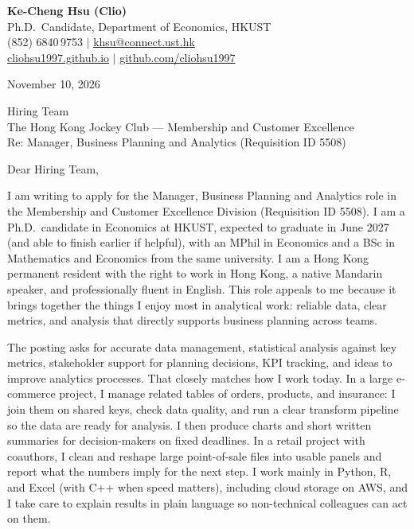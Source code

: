 \documentclass[11pt,letterpaper]{article}
\begin{document}
\noindent
{\bfseries Ke-Cheng Hsu (Clio)}\\
Ph.D.\ Candidate, Department of Economics, HKUST\\
(852) 6840\,9753 \quad $|$ \quad \href{mailto:khsu@connect.ust.hk}{khsu@connect.ust.hk}\\
\href{https://cliohsu1997.github.io/}{cliohsu1997.github.io} \quad $|$ \quad \href{https://github.com/cliohsu1997}{github.com/cliohsu1997}

\vspace{0.7em}
\noindent
November 10, 2026

\vspace{0.35em}
\noindent
Hiring Team\\
The Hong Kong Jockey Club --- Membership and Customer Excellence\\
Re: Manager, Business Planning and Analytics (Requisition ID 5508)

\vspace{0.2em}
Dear Hiring Team,

I am writing to apply for the Manager, Business Planning and Analytics role in the Membership and Customer Excellence Division (Requisition ID 5508). I am a Ph.D.\ candidate in Economics at HKUST, expected to graduate in June 2027 (and able to finish earlier if helpful), with an MPhil in Economics and a BSc in Mathematics and Economics from the same university. I am a Hong Kong permanent resident with the right to work in Hong Kong, a native Mandarin speaker, and professionally fluent in English. This role appeals to me because it brings together the things I enjoy most in analytical work: reliable data, clear metrics, and analysis that directly supports business planning across teams.

The posting asks for accurate data management, statistical analysis against key metrics, stakeholder support for planning decisions, KPI tracking, and ideas to improve analytics processes. That closely matches how I work today. In a large e-commerce project, I manage related tables of orders, products, and insurance: I join them on shared keys, check data quality, and run a clear transform pipeline so the data are ready for analysis. I then produce charts and short written summaries for decision-makers on fixed deadlines. In a retail project with coauthors, I clean and reshape large point-of-sale files into usable panels and report what the numbers imply for the next step. I work mainly in Python, R, and Excel (with C++ when speed matters), including cloud storage on AWS, and I take care to explain results in plain language so non-technical colleagues can act on them.
\end{document}
